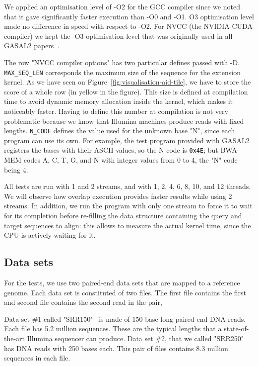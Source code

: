 We applied an optimisation level of -O2 for the GCC compiler since we noted that it gave significantly faster execution than -O0 and -O1. O3 optimisation level made no difference in speed with respect to -O2. For NVCC (the NVIDIA CUDA compiler) we kept the -O3 optimisation level that was originally used in all GASAL2 papers~\cite{Ahmed:gasal}.

The row "NVCC compiler options" has two particular defines passed with -D. \verb|MAX_SEQ_LEN| corresponds the maximum size of the sequence for the extension kernel. As we have seen on Figure~\ref{fig:visualisation-aid-tile}, we have to store the score of a whole row (in yellow in the figure). This size is defined at compilation time to avoid dynamic memory allocation inside the kernel, which makes it noticeably faster. Having to define this number at compilation is not very problematic because we know that Illumina machines produce reads with fixed lengths. \verb|N_CODE| defines the value used for the unknown base "N", since each program can use its own. For example, the test program provided with GASAL2 registers the bases with their ASCII values, so the N code is \verb|0x4E|; but BWA-MEM codes A, C, T, G, and N with integer values from 0 to 4, the "N" code being 4.

All tests are run with 1 and 2 streams, and with 1, 2, 4, 6, 8, 10, and 12 threads. We will observe how overlap execution provides faster results while using 2 streams. In addition, we run the program with only one stream to force it to wait for its completion before re-filling the data structure containing the query and target sequences to align: this allows to measure the actual kernel time, since the CPU is actively waiting for it. 

\subsection{Data sets}

For the tests, we use two paired-end data sets that are mapped to a reference genome. Each data set is constituted of two files. The first file contains the first and second file contains the second read in the pair, 

Data set \#1 called "SRR150"~\cite{ncbi:srr150} is made of 150-base long paired-end DNA reads. Each file has 5.2 million sequences. These are the typical lengths that a state-of-the-art Illumina sequencer can produce. Data set \#2, that we called "SRR250"~\cite{ncbi:srr250} has DNA reads with 250 bases each. This pair of files contains 8.3 million sequences in each file.

